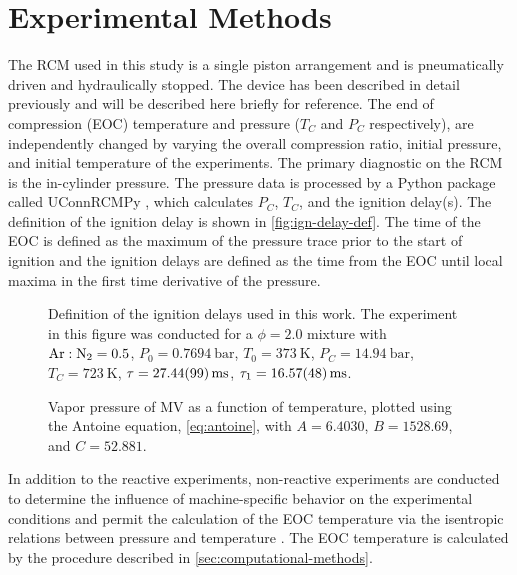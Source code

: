 \documentclass[12pt]{../ussci}
\begin{document}
\section{Experimental Methods}\label{sec:experimental-methods}

The RCM used in this study is a single piston arrangement and is pneumatically
driven and hydraulically stopped. The device has been described in detail
previously \autocite{Mittal2007a} and will be described here briefly for
reference. The end of compression (EOC) temperature and pressure (\(T_C\) and
\(P_C\) respectively), are independently changed by varying the overall
compression ratio, initial pressure, and initial temperature of the experiments.
The primary diagnostic on the RCM is the in-cylinder pressure. The pressure data
is processed by a Python package called UConnRCMPy \autocite{uconnrcmpy}, which
calculates \(P_C\), \(T_C\), and the ignition delay(s). The definition of the
ignition delay is shown in \cref{fig:ign-delay-def}. The time of the EOC is
defined as the maximum of the pressure trace prior to the start of ignition and
the ignition delays are defined as the time from the EOC until local maxima in
the first time derivative of the pressure.

\begin{figure}[htb]
    \begin{minipage}[t]{0.48\textwidth}
        \centering
        \resizebox{\linewidth}{!}{}
        \caption{Definition of the ignition delays used in this work. The
        experiment in this figure was conducted for a \(\phi=2.0\) mixture with
        \mbox{\(\ce{Ar}:\ce{N2}=0.5\)}, \(P_0=\SI{0.7694}{\bar}\),
        \(T_0=\SI{373}{\K}\), \(P_C=\SI{14.94}{\bar}\), \(T_C=\SI{723}{\K}\),
        \(\tau=\SI{27.44\pm0.99}{\ms}\), \(\tau_1=\SI{16.57\pm0.48}{\ms}\).}
        \label{fig:ign-delay-def}
    \end{minipage}\hfill%
    \begin{minipage}[t]{0.48\textwidth}
        \centering
        \resizebox{\linewidth}{!}{}
        \caption{Vapor pressure of MV as a function of temperature, plotted
        using the Antoine equation, \cref{eq:antoine}, with \(A=6.4030\), \(B=1528.69\), and \(C=52.881\).}
        \label{fig:vapor-pressure}
    \end{minipage}
\end{figure}

In addition to the reactive experiments, non-reactive experiments are conducted
to determine the influence of machine-specific behavior on the experimental
conditions and permit the calculation of the EOC temperature via the isentropic
relations between pressure and temperature \autocite{Lee1998}. The EOC
temperature is calculated by the procedure described in
\cref{sec:computational-methods}.
\end{document}
